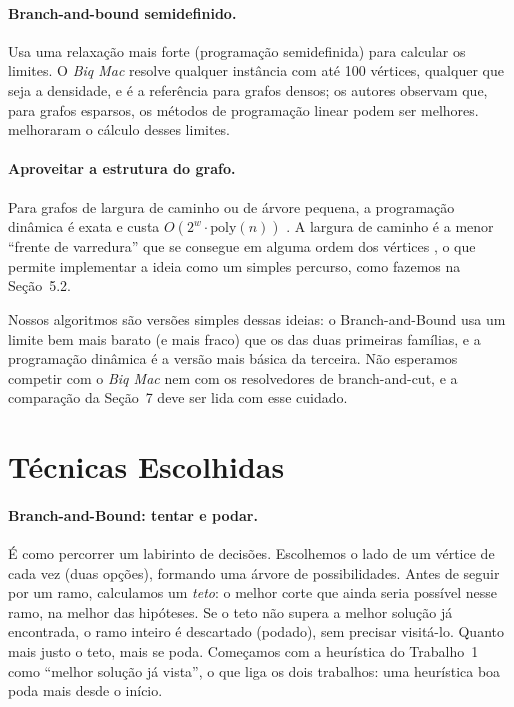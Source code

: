 \paragraph{Branch-and-bound semidefinido.} Usa uma relaxação mais forte (programação semidefinida) para calcular os limites. O \emph{Biq Mac} \cite{Rendl et al. 2010} resolve qualquer instância com até 100 vértices, qualquer que seja a densidade, e é a referência para grafos densos; os autores observam que, para grafos esparsos, os métodos de programação linear podem ser melhores. \citet{Krislock et al. 2014} melhoraram o cálculo desses limites.

\paragraph{Aproveitar a estrutura do grafo.} Para grafos de largura de caminho ou de árvore pequena, a programação dinâmica é exata e custa $O(2^{w}\cdot\mathrm{poly}(n))$ \cite{Arnborg et al. 1991, Bodlaender 1993}. A largura de caminho é a menor ``frente de varredura'' que se consegue em alguma ordem dos vértices \cite{Kinnersley 1992}, o que permite implementar a ideia como um simples percurso, como fazemos na Seção~5.2.

Nossos algoritmos são versões simples dessas ideias: o Branch-and-Bound usa um limite bem mais barato (e mais fraco) que os das duas primeiras famílias, e a programação dinâmica é a versão mais básica da terceira. Não esperamos competir com o \emph{Biq Mac} nem com os resolvedores de branch-and-cut, e a comparação da Seção~7 deve ser lida com esse cuidado.

\section{Técnicas Escolhidas}

\paragraph{Branch-and-Bound: tentar e podar.} É como percorrer um labirinto de decisões. Escolhemos o lado de um vértice de cada vez (duas opções), formando uma árvore de possibilidades. Antes de seguir por um ramo, calculamos um \emph{teto}: o melhor corte que ainda seria possível nesse ramo, na melhor das hipóteses. Se o teto não supera a melhor solução já encontrada, o ramo inteiro é descartado (podado), sem precisar visitá-lo. Quanto mais justo o teto, mais se poda. Começamos com a heurística do Trabalho~1 como ``melhor solução já vista'', o que liga os dois trabalhos: uma heurística boa poda mais desde o início.

